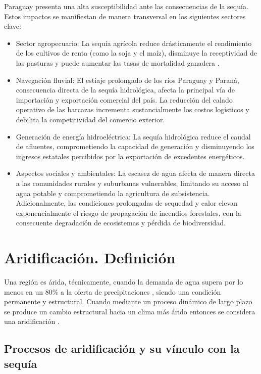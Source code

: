 Paraguay presenta una alta susceptibilidad ante las consecuencias de la sequía. Estos impactos se manifiestan de manera transversal en los siguientes sectores clave:
\begin{itemize}
    \item {Sector agropecuario:} La sequía agrícola reduce drásticamente el rendimiento de los cultivos de renta (como la soja y el maíz), disminuye la receptividad de las pasturas y puede aumentar las tasas de mortalidad ganadera \cite{cepal2014}.
    \item {Navegación fluvial:} El estiaje prolongado de los ríos Paraguay y Paraná, consecuencia directa de la sequía hidrológica, afecta la principal vía de importación y exportación comercial del país. La reducción del calado operativo de las barcazas incrementa sustancialmente los costos logísticos y debilita la competitividad del comercio exterior.
    \item {Generación de energía hidroeléctrica:} La sequía hidrológica reduce el caudal de afluentes, comprometiendo la capacidad de generación y disminuyendo los ingresos estatales percibidos por la exportación de excedentes energéticos.
    \item {Aspectos sociales y ambientales:} La escasez de agua afecta de manera directa a las comunidades rurales y suburbanas vulnerables, limitando su acceso al agua potable y comprometiendo la agricultura de subsistencia. Adicionalmente, las condiciones prolongadas de sequedad y calor elevan exponencialmente el riesgo de propagación de incendios forestales, con la consecuente degradación de ecosistemas y pérdida de biodiversidad.
\end{itemize}

\section{Aridificación. Definición}

Una región es árida, técnicamente, cuando la demanda de agua supera por lo menos en un 80\% a la oferta de precipitaciones \cite{atlas1992}, siendo una condición permanente y estructural. Cuando mediante un proceso dinámico de largo plazo se produce un cambio estructural hacia un clima más árido entonces se considera una aridificación \cite{vicenteserrano2010}.

\subsection{Procesos de aridificación y su vínculo con la sequía}

